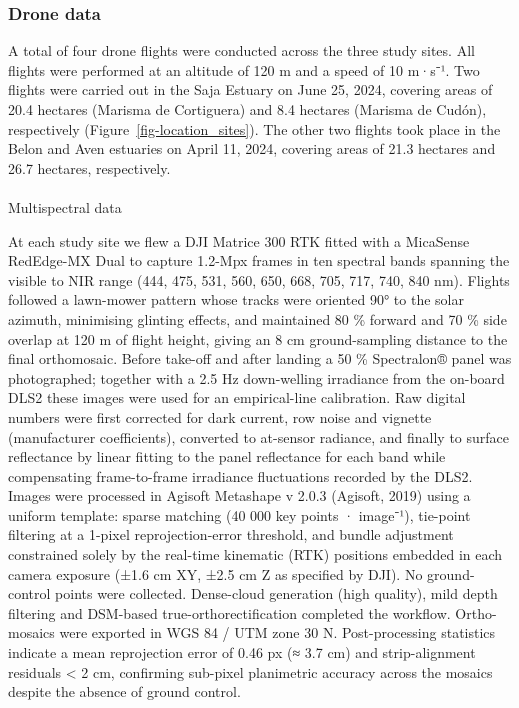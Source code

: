 \documentclass[
  letterpaper,
  DIV=11,
  numbers=noendperiod]{scrartcl}
\makeatletter
\let\oldparagraph\paragraph
\renewcommand{\paragraph}{
    \@ifstar
      \xxxParagraphStar
      \xxxParagraphNoStar
  }
\newcommand{\xxxParagraphStar}[1]{\oldparagraph*{#1}\mbox{}}
\newcommand{\xxxParagraphNoStar}[1]{\oldparagraph{#1}\mbox{}}
\makeatother
\begin{document}
\subsubsection{Drone data}\label{drone-data}

A total of four drone flights were conducted across the three study
sites. All flights were performed at an altitude of 120 m and a speed of
10 m·s⁻¹. Two flights were carried out in the Saja Estuary on June 25,
2024, covering areas of 20.4 hectares (Marisma de Cortiguera) and 8.4
hectares (Marisma de Cudón), respectively
(Figure~\ref{fig-location_sites}). The other two flights took place in
the Belon and Aven estuaries on April 11, 2024, covering areas of 21.3
hectares and 26.7 hectares, respectively.

\paragraph{Multispectral data}\label{sec-photo}

At each study site we flew a DJI Matrice 300 RTK fitted with a MicaSense
RedEdge-MX Dual to capture 1.2-Mpx frames in ten spectral bands spanning
the visible to NIR range (444, 475, 531, 560, 650, 668, 705, 717, 740,
840 nm). Flights followed a lawn-mower pattern whose tracks were
oriented 90° to the solar azimuth, minimising glinting effects, and
maintained 80 \% forward and 70 \% side overlap at 120 m of flight
height, giving an 8 cm ground-sampling distance to the final
orthomosaic. Before take-off and after landing a 50 \% Spectralon® panel
was photographed; together with a 2.5 Hz down-welling irradiance from
the on-board DLS2 these images were used for an empirical-line
calibration. Raw digital numbers were first corrected for dark current,
row noise and vignette (manufacturer coefficients), converted to
at-sensor radiance, and finally to surface reflectance by linear fitting
to the panel reflectance for each band while compensating frame-to-frame
irradiance fluctuations recorded by the DLS2. Images were processed in
Agisoft Metashape v 2.0.3 (Agisoft, 2019) using a uniform template:
sparse matching (40 000 key points · image⁻¹), tie-point filtering at a
1-pixel reprojection-error threshold, and bundle adjustment constrained
solely by the real-time kinematic (RTK) positions embedded in each
camera exposure (±1.6 cm XY, ±2.5 cm Z as specified by DJI). No
ground-control points were collected. Dense-cloud generation (high
quality), mild depth filtering and DSM-based true-orthorectification
completed the workflow. Ortho-mosaics were exported in WGS 84 / UTM zone
30 N. Post-processing statistics indicate a mean reprojection error of
0.46 px (≈ 3.7 cm) and strip-alignment residuals \textless{} 2 cm,
confirming sub-pixel planimetric accuracy across the mosaics despite the
absence of ground control.
\end{document}
